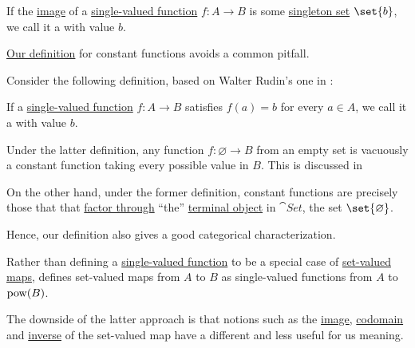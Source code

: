 \begin{definition}\label{def:constant_function}\mimprovised
  If the \hyperref[def:set_valued_map/image]{image} of a \hyperref[def:function]{single-valued function} \( f: A \to B \) is some \hyperref[rem:singleton_sets]{singleton set} \( \set{ b } \), we call it a  with value \( b \).
\end{definition}

\begin{remark}\label{rem:constant_function}
  \hyperref[def:constant_function]{Our definition} for constant functions avoids a common pitfall.

  Consider the following definition, based on Walter Rudin's one in \cite[def. 4.3]{Rudin1976AnalysisPrinciples}:
  \begin{displayquote}
    If a \hyperref[def:function]{single-valued function} \( f: A \to B \) satisfies \( f(a) = b \) for every \( a \in A \), we call it a  with value \( b \).
  \end{displayquote}

  Under the latter definition, any function \( f: \varnothing \to B \) from an empty set is vacuously a constant function taking every possible value in \( B \). This is discussed in

  On the other hand, under the former definition, constant functions are precisely those that that \hyperref[def:factors_through]{factor through} \enquote{the} \hyperref[def:universal_objects/terminal]{terminal object} in \hyperref[def:category_of_small_sets]{\( \cat{Set} \)}, the set \( \set{ \varnothing } \).

  Hence, our definition also gives a good categorical characterization.
\end{remark}

\begin{remark}\label{rem:set_valued_map_as_single_valued}
  Rather than defining a \hyperref[def:function]{single-valued function} to be a special case of \hyperref[def:set_valued_map]{set-valued maps},  defines set-valued maps from \( A \) to \( B \) as single-valued functions from \( A \) to \( \operatorname{pow}(B) \).

  The downside of the latter approach is that notions such as the \hyperref[def:set_valued_map/image]{image}, \hyperref[def:set_valued_map/codomain]{codomain} and \hyperref[def:set_valued_map/inverse]{inverse} of the set-valued map have a different and less useful for us meaning.
\end{remark}

